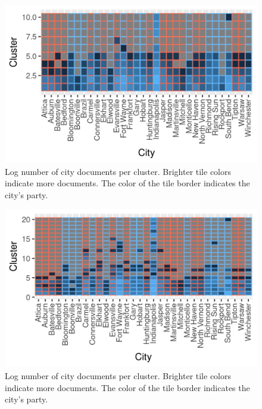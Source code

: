 \documentclass[11pt]{article}
\begin{document}
\begin{figure}[!ht]
	\centering
	\caption{Log number of city documents per cluster. Brighter tile colors indicate more documents. The color of the tile border indicates the city's party.}
	\label{hclustCity10}
	\includegraphics[width=\linewidth]{figures/heatmap_hclust_10.png}
\end{figure}

\begin{figure}[!ht]
	\centering
	\caption{Log number of city documents per cluster. Brighter tile colors indicate more documents. The color of the tile border indicates the city's party.}
	\label{hclustCity20}
	\includegraphics[width=\linewidth]{figures/heatmap_hclust_20.png}
\end{figure}
\end{document}

